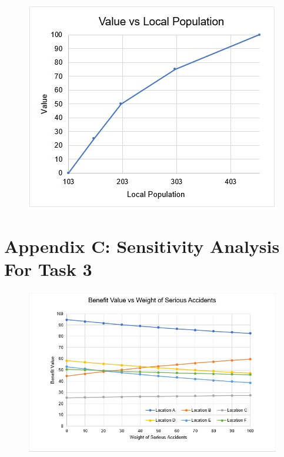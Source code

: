 \documentclass[11pt, a4paper]{article}
\begin{document}
        \begin{figure}[!ht]
            \centering
            \includegraphics[width=\textwidth]{appendices/2c.jpg}
        \end{figure}

    \newpage
    \section*{Appendix C: Sensitivity Analysis For Task 3}

        \begin{figure}[!ht]
            \centering
            \includegraphics[width=\textwidth]{appendices/3a.jpg}
        \end{figure}
\end{document}
